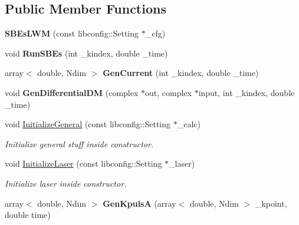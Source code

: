 \subsection*{Public Member Functions}
\begin{DoxyCompactItemize}
\item 
\mbox{\label{class_s_b_es_l_w_m_a202d57437ea16963c02602245e9dc7ce}} 
{\bfseries S\+B\+Es\+L\+WM} (const libconfig\+::\+Setting $\ast$\+\_\+cfg)
\item 
\mbox{\label{class_s_b_es_l_w_m_a3c5f81301ff1d5501276b4639507b184}} 
void {\bfseries Run\+S\+B\+Es} (int \+\_\+kindex, double \+\_\+time)
\item 
\mbox{\label{class_s_b_es_l_w_m_a3361efbc61c77184eabb9052702afdc5}} 
array$<$ double, Ndim $>$ {\bfseries Gen\+Current} (int \+\_\+kindex, double \+\_\+time)
\item 
\mbox{\label{class_s_b_es_l_w_m_a176ea9f33a8bcbda2c3a2cee664eb6ee}} 
void {\bfseries Gen\+Differential\+DM} (complex $\ast$out, complex $\ast$input, int \+\_\+kindex, double \+\_\+time)
\item 
\mbox{\label{class_s_b_es_l_w_m_a61ff0bb0410d43305a870af59748c1be}} 
void \hyperlink{class_s_b_es_l_w_m_a61ff0bb0410d43305a870af59748c1be}{Initialize\+General} (const libconfig\+::\+Setting $\ast$\+\_\+calc)
\begin{DoxyCompactList}\small\item\em Initialize general stuff inside constructor. \end{DoxyCompactList}\item 
\mbox{\label{class_s_b_es_l_w_m_aa39b4799f8c90c8da3e532ae25ceb3fb}} 
void \hyperlink{class_s_b_es_l_w_m_aa39b4799f8c90c8da3e532ae25ceb3fb}{Initialize\+Laser} (const libconfig\+::\+Setting $\ast$\+\_\+laser)
\begin{DoxyCompactList}\small\item\em Initialize laser inside constructor. \end{DoxyCompactList}\item 
\mbox{\label{class_s_b_es_l_w_m_a639e4270ee7741150141e4804c03555b}} 
array$<$ double, Ndim $>$ {\bfseries Gen\+KpulsA} (array$<$ double, Ndim $>$ \+\_\+kpoint, double time)
\end{DoxyCompactItemize}
